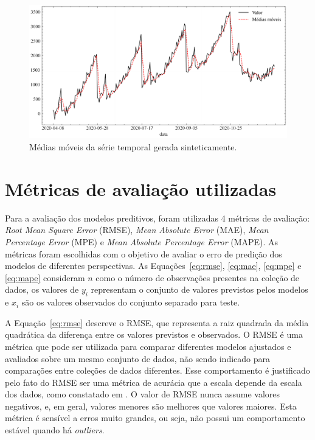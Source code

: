\begin{figure}[!htp]
    \centering
    \includegraphics[width=5.0in]{img/dados_sinteticos_ma.pdf}
    \caption{Médias móveis da série temporal gerada sinteticamente.}
    \label{fig:dados_sinteticos_ma}
\end{figure}

\FloatBarrier

\section{Métricas de avaliação utilizadas} \label{sec:metrics}
Para a avaliação dos modelos preditivos, foram utilizadas 4 métricas de avaliação: \textit{Root Mean Square Error} (RMSE), \textit{Mean Absolute Error} (MAE), \textit{Mean Percentage Error} (MPE) e \textit{Mean Absolute Percentage Error} (MAPE). As métricas foram escolhidas com o objetivo de avaliar o erro de predição dos modelos de diferentes perspectivas. As Equações~\ref{eq:rmse}, \ref{eq:mae}, \ref{eq:mpe} e \ref{eq:mape} consideram $n$ como o número de observações presentes na coleção de dados, os valores de $y_{i}$ representam o conjunto de valores previstos pelos modelos e $x_{i}$ são os valores observados do conjunto separado para teste.

A Equação~\ref{eq:rmse} descreve o RMSE, que representa a raiz quadrada da média quadrática da diferença entre os valores previstos e observados. O RMSE é uma métrica que pode ser utilizada para comparar diferentes modelos ajustados e avaliados sobre um mesmo conjunto de dados, não sendo indicado para comparações entre coleções de dados diferentes. Esse comportamento é justificado pelo fato do RMSE ser uma métrica de acurácia que a escala depende da escala dos dados, como constatado em \cite{HYNDMAN2006679}. O valor de RMSE nunca assume valores negativos, e, em geral, valores menores são melhores que valores maiores. Esta métrica é sensível a erros muito grandes, ou seja, não possui um comportamento estável quando há \textit{outliers}.

